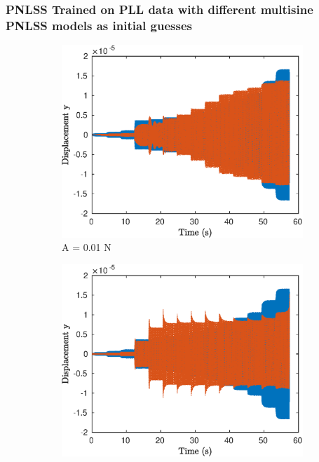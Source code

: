 \documentclass[aspectratio=169]{beamer}
\begin{document}
\begin{frame}[allowframebreaks]
  \frametitle{PNLSS Trained on PLL data with different multisine PNLSS
  models as initial guesses}
  \begin{figure}[!h]
    \centering
    \begin{subfigure}[!h]{0.2\linewidth}
      \includegraphics[width=\linewidth]{../../benchmark4/FIGURES/TDOMPERF_PNLSS_PLL_famp001_nx23}
      \caption{A = 0.01 N}
    \end{subfigure}%
    \begin{subfigure}[!h]{0.2\linewidth}
      \includegraphics[width=\linewidth]{../../benchmark4/FIGURES/TDOMPERF_PNLSS_PLL_famp01_nx23} 

\end{subfigure}
\end{figure}
\end{frame}
\end{document}
